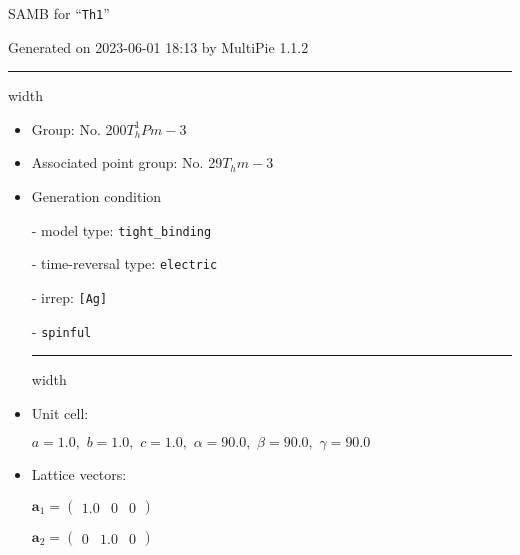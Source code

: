 \documentclass[fleqn,10pt,landscape]{article}
\begin{document}
\setcounter{MaxMatrixCols}{16}

\setlength{\baselineskip}{16pt}
\footnotesize
\begin{center}
\LARGE
SAMB for ``\texttt{Th1}''
\end{center}
\begin{flushright}
Generated on 2023-06-01 18:13 by MultiPie 1.1.2
\end{flushright}
\vspace{1cm}


 \hfil \hrule height 1mm width \textwidth \hfil

\begin{itemize}
\item Group: No. 200\quad$T_{h}^{1}$\quad$Pm-3$\quad[ cubic ]

\item Associated point group: No. 29\quad$T_{h}$\quad$m-3$\quad[ cubic ]

\vspace{5mm}

\item Generation condition

\quad - model type: \texttt{tight_binding}

\quad - time-reversal type: \texttt{electric}

\quad - irrep: \texttt{[Ag]}

\quad - \texttt{spinful}


 \hfil \hrule height 1mm width \textwidth \hfil

\item Unit cell:

\quad $a=1.0,\,\, b=1.0,\,\, c=1.0,\,\, \alpha=90.0,\,\, \beta=90.0,\,\, \gamma=90.0$

\item Lattice vectors:

\quad $\bm{a}_1=\begin{pmatrix} 1.0 & 0 & 0 \end{pmatrix}$

\quad $\bm{a}_2=\begin{pmatrix} 0 & 1.0 & 0 \end{pmatrix}$


\end{itemize}
\end{document}
